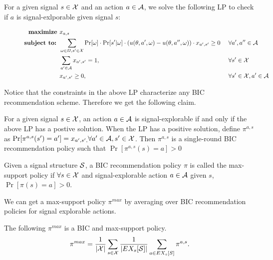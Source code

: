 For a given signal $s \in \X$ and an action $a \in \A$, we solve the following LP to check if $a$ is signal-exlporable given signal $s$:

\begin{figure}[H]
\begin{mdframed}
\begin{alignat*}{2}
  \textbf{maximize }   & x_{a,s}\  \\
  \textbf{subject to: } & \sum_{\omega \in \varOmega, s' \in \X} \Pr[\omega] \cdot \Pr[s' | \omega] \cdot \left(u(\theta, a', \omega) - u(\theta, a'', \omega)\right) \cdot x_{a',s'} \geq 0   &\ & \forall a',a'' \in \A \\
                       & \sum_{a'\in \A} x_{a',s'} = 1,  \ &\ & \forall s' \in \X \\
                       & x_{a',s'} \geq 0,  \ &\ & \forall s' \in \X, a'\in \A \\
\end{alignat*}
\end{mdframed}
\label{fig:public_lp}
\end{figure}

Notice that the constraints in the above LP characterize any BIC recommendation scheme. Therefore we get the following claim. 
\begin{claim}
For a given signal $s \in \X$, an action $a \in \A$ is signal-explorable if and only if the above LP has a postive solution. When the LP has a positive solution, define $\pi^{a,s}$ as $\Pr[\pi^{a,s}(s') = a'] = x_{a',s', } \forall a' \in \A, s' \in \X$. Then $\pi^{a,s}$ is a single-round BIC recommendation policy such that $\Pr[\pi^{a,s}(s) = a] > 0$
\end{claim}

\begin{definition}
Given a signal structure $\S$, a BIC recommendation policy $\pi$ is called the max-support policy if $\forall s \in \X$  and signal-explorable action $a\in \A$ given $s$, $\Pr[\pi(s) = a] > 0$. 
\end{definition}


We can get a max-support policy $\pi^{max}$ by averaging over BIC recommendation policies for signal explorable actions.
\begin{claim}
\label{clm:pimax}
The following $\pi^{max}$ is a BIC and max-support policy. 
\[
\pi^{max} = \frac{1}{|\X|} \sum_{s \in \X} \frac{1}{|\EX_s[\S]|} \sum_{a \in \EX_s[S]} \pi^{a,s}.
\]
\end{claim}

